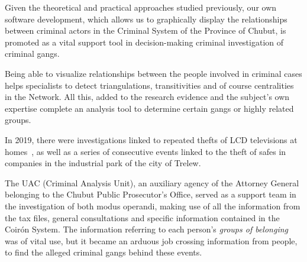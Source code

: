 Given the theoretical and practical approaches studied previously, our own software development, which allows us to graphically display the relationships between criminal actors in the Criminal System of the Province of Chubut, is promoted as a vital support tool in decision-making criminal investigation of criminal gangs.

Being able to visualize relationships between the people involved in criminal cases helps specialists to detect triangulations, transitivities and of course centralities in the Network. All this, added to the research evidence and the subject's own expertise complete an analysis tool to determine certain gangs or highly related groups.

In 2019, there were investigations linked to repeated thefts of LCD televisions at homes~\cite{noticiaLCDdiario}, as well as a series of consecutive events linked to the theft of safes in companies in the industrial park of the city of Trelew.

The UAC (Criminal Analysis Unit), an auxiliary agency of the Attorney General belonging to the Chubut Public Prosecutor's Office, served as a support team in the investigation of both modus operandi, making use of all the information from the tax files, general consultations and specific information contained in the Coirón System. The information referring to each person's \textit{groups of belonging} was of vital use, but it became an arduous job crossing information from people, to find the alleged criminal gangs behind these events.

